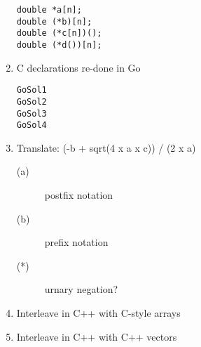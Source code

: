 \documentclass{article}
\begin{document}
\begin{enumerate}
\begin{verbatim}
double *a[n];
double (*b)[n];
double (*c[n])();
double (*d())[n];
\end{verbatim}
\item C declarations re-done in Go
\begin{verbatim}
GoSol1
GoSol2
GoSol3
GoSol4
\end{verbatim}
\item Translate: (-b + sqrt(4 x a x c)) / (2 x a)
\begin{description}
    \item[(a)] postfix notation
    \item[(b)] prefix notation
    \item[(*)] urnary negation?
\end{description}
\item Interleave in C++ with C-style arrays
\item Interleave in C++ with C++ vectors
\end{enumerate}
\end{document}
